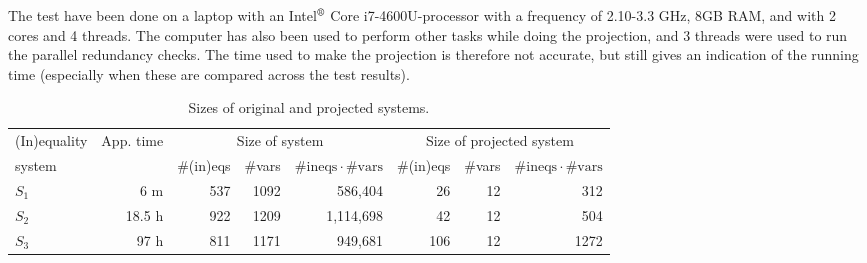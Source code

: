 The test have been done on a laptop with an Intel$^\text{\textregistered}$ Core\texttrademark\; i7-4600U-processor with a frequency of 2.10-3.3 GHz, 8GB RAM, and with 2 cores and 4 threads. The computer has also been used to perform other tasks while doing the projection, and 3 threads were used to run the parallel redundancy checks. The time used to make the projection is therefore not accurate, but still gives an indication of the running time (especially when these are compared across the test results). 
%
\begin{table}[H]
\centering
\noindent\begin{tabular}{|l|r|r|r|r|r|r|r|}
\hline
(In)equality&App. time&\multicolumn{3}{c|}{Size of system}&\multicolumn{3}{c|}{Size of projected system}\\ %
system&&{\#(in)eqs}&{\#vars}&${\#\text{ineqs}\cdot\#\text{vars}}$&{\#(in)eqs}&{\#vars}&${\#\text{ineqs}\cdot\#\text{vars}}$\\
\hline
$S_1$&6 m&537&1092&586,404&26&12&312\\
$S_2$&18.5 h&922&1209&1,114,698&42&12&504\\
$S_3$&97 h&811&1171&949,681&106&12&1272\\
\hline
\end{tabular}
\caption{Sizes of original and projected systems.}\label{tab:results}
\end{table}
%



